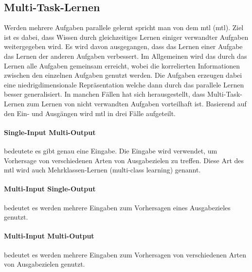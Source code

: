 		\subsection{Multi-Task-Lernen}
		Werden mehrere Aufgaben parallele gelernt spricht man von dem \acl{mtl} (\ac{mtl}). Ziel ist es dabei, dass Wissen durch gleichzeitiges Lernen einiger verwandter Aufgaben weitergegeben wird. Es wird davon ausgegangen, dass das Lernen einer Aufgabe das Lernen der anderen Aufgaben verbessert. Im Allgemeinen wird das durch das Lernen alle Aufgaben gemeinsam erreicht, wobei die korrelierten Informationen zwischen den einzelnen Aufgaben genutzt werden. Die Aufgaben erzeugen dabei eine niedrigdimensionale Repräsentation welche dann durch das parallele Lernen besser generalisiert. In manchen Fällen hat sich herausgestellt, dass Multi-Task-Lernen zum Lernen von nicht verwandten Aufgaben vorteilhaft ist.
		Basierend auf den Ein- und Ausgängen wird \ac{mtl} in drei Fälle aufgeteilt. 
 		
 		\paragraph{Single-Input Multi-Output} bedeutete es gibt genau eine Eingabe. Die Eingabe wird verwendet, um Vorhersage von verschiedenen Arten von Ausgabezielen zu treffen. Diese Art des \ac{mtl} wird auch Mehrklassen-Lernen (multi-class learning) genannt.
		
		\paragraph{Multi-Input Single-Output} bedeutet es werden mehrere Eingaben zum Vorhersagen eines Ausgabezieles genutzt.
	
		\paragraph{Multi-Input Multi-Output} bedeutet es werden mehrere Eingaben zum Vorhersagen von verschiedenen Arten von Ausgabezielen genutzt.
		
